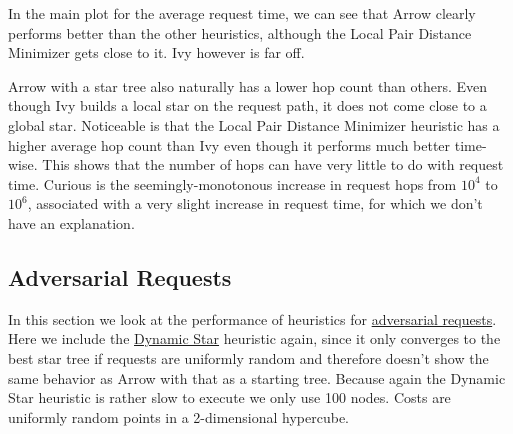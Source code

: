 \documentclass[a4paper, oneside]{discothesis}
\begin{document}

In the main plot for the average request time, we can see that Arrow clearly performs better than the other heuristics, although the Local Pair Distance Minimizer gets close to it. Ivy however is far off.

Arrow with a star tree also naturally has a lower hop count than others. Even though Ivy builds a local star on the request path, it does not come close to a global star. Noticeable is that the Local Pair Distance Minimizer heuristic has a higher average hop count than Ivy even though it performs much better time-wise. This shows that the number of hops can have very little to do with request time. Curious is the seemingly-monotonous increase in request hops from $10^4$ to $10^6$, associated with a very slight increase in request time, for which we don't have an explanation.

\subsection{Adversarial Requests}\label{result:adversary}

In this section we look at the performance of heuristics for \hyperref[req:adversary]{adversarial requests}. Here we include the \hyperref[alg:dynstar]{Dynamic Star} heuristic again, since it only converges to the best star tree if requests are uniformly random and therefore doesn't show the same behavior as Arrow with that as a starting tree. Because again the Dynamic Star heuristic is rather slow to execute we only use 100 nodes. Costs are uniformly random points in a 2-dimensional hypercube.
\end{document}
